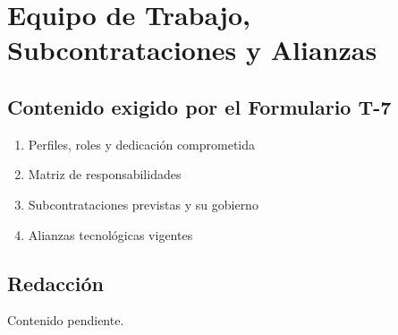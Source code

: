 \section{Equipo de Trabajo, Subcontrataciones y Alianzas}

%

\subsection{Contenido exigido por el Formulario T-7}

\begin{enumerate}
    \item Perfiles, roles y dedicación comprometida
    \item Matriz de responsabilidades
    \item Subcontrataciones previstas y su gobierno
    \item Alianzas tecnológicas vigentes
\end{enumerate}

\subsection{Redacción}

Contenido pendiente.
